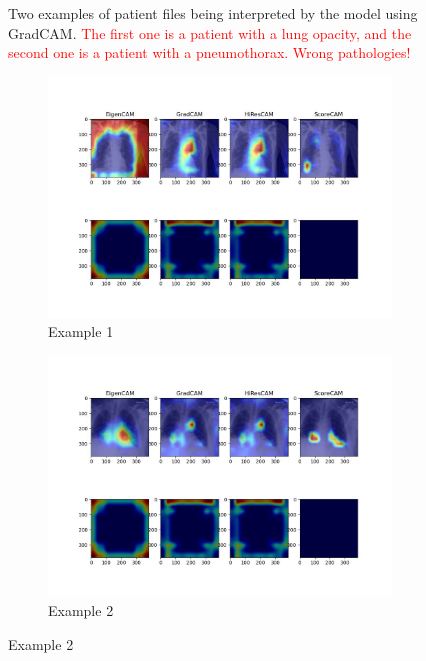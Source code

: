 \documentclass[11pt]{article}
\newcommand\myworries[1]{\textcolor{red}{#1}}
\begin{document}
\begin{figure}[H]
\begin{subfigure}[b]{0.45\textwidth}
                 \end{subfigure}
                 \label{fig:gradcam_example_chexpert_3}
                 \caption{Two examples of patient files being interpreted by the model using GradCAM. \myworries{The first one is a patient with a lung opacity, and the second one is a patient with a pneumothorax. Wrong pathologies!}}

            \end{figure}


        \begin{figure}[H]
                 \centering
                 \begin{subfigure}[b]{\textwidth}
                     \centering
                     \includegraphics[width=\textwidth]{CheXpert2/inference/heatmaps_2.jpg}
                     \caption{Example 1}
                     \vspace{4ex}

                 \end{subfigure}
                 \hfill
                 \begin{subfigure}[b]{\textwidth}
                     \centering
                     \includegraphics[width=\textwidth]{CheXpert2/inference/heatmaps_5.jpg}
                     \caption{Example 2}
                     \vspace{4ex}


\end{subfigure}
\end{figure}
\end{document}
